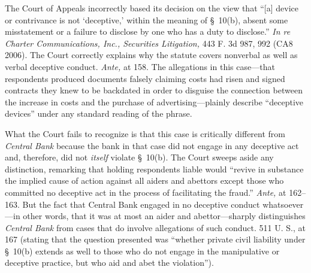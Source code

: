  The Court of Appeals incorrectly based its decision on the view that ``[a] device or contrivance is not ‘deceptive,' within the meaning of \S~10(b), absent some misstatement or a failure to disclose by one who has a duty to disclose.'' \emph{In re Charter Communications, Inc., Securities Litigation,} 443 F. 3d 987, 992 (CA8 2006). The Court correctly explains why the statute covers nonverbal as well as verbal deceptive conduct. \emph{Ante,} at 158. The allegations in this case---that respondents \newpage  produced documents falsely claiming costs had risen and signed contracts they knew to be backdated in order to disguise the connection between the increase in costs and the purchase of advertising---plainly describe ``deceptive devices'' under any standard reading of the phrase.



  What the Court fails to recognize is that this case is critically different from \emph{Central Bank} because the bank in that case did not engage in any deceptive act and, therefore, did not \emph{itself} violate \S~10(b). The Court sweeps aside any distinction, remarking that holding respondents liable would ``revive in substance the implied cause of action against all aiders and abettors except those who committed no deceptive act in the process of facilitating the fraud.'' \emph{Ante,} at 162--163. But the fact that Central Bank engaged in no deceptive conduct whatsoever---in other words, that it was at most an aider and abettor---sharply distinguishes \emph{Central Bank} from cases that do involve allegations of such conduct. 511 U. S., at 167 (stating that the question presented was ``whether private civil liability under \S~10(b) extends as well to those who do not engage in the manipulative or deceptive practice, but who aid and abet the violation'').

